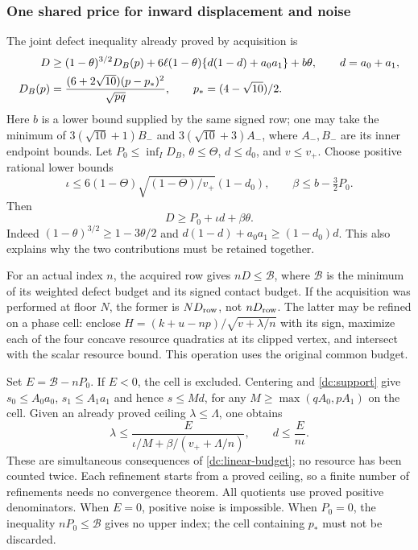\subsubsection{One shared price for inward displacement and noise}
\label{dc:budget}
The joint defect inequality already proved by acquisition is
\begin{align}
 D\ge{}&(1-\theta)^{3/2}D_B(p)
 +6\ell(1-\theta)\{d(1-d)+a_0a_1\}+b\theta,
 \qquad d=a_0+a_1,\label{dc:joint}\\
 D_B(p)={}&\frac{(6+2\sqrt{10})(p-p_*)^2}{\sqrt{pq}},
 \qquad p_*=(4-\sqrt{10})/2.\notag
\end{align}
Here $b$ is a lower bound supplied by the same signed row; one may take
the minimum of $3(\sqrt{10}+1)B_-$ and
$3(\sqrt{10}+3)A_-$, where $A_-,B_-$ are its inner endpoint bounds.
Let $P_0\le\inf_I D_B$, $\theta\le\Theta$, $d\le d_0$, and $v\le v_+$.
Choose positive rational lower bounds
\[
 \iota\le6(1-\Theta)\sqrt{(1-\Theta)/v_+}(1-d_0),\qquad
 \beta\le b-\tfrac32P_0.
\]
Then
\begin{equation}\label{dc:linear-budget}
                 D\ge P_0+\iota d+\beta\theta.
\end{equation}
Indeed $(1-\theta)^{3/2}\ge1-3\theta/2$ and
$d(1-d)+a_0a_1\ge(1-d_0)d$. This also explains why the two
contributions must be retained together.

For an actual index $n$, the acquired row gives
$nD\le\mathcal B$, where $\mathcal B$ is the minimum of its weighted
defect budget and its signed contact budget. If the acquisition was performed
at floor $N$, the former is $ND_{\rm row}$, not $nD_{\rm row}$.
The latter may be refined on a phase cell: enclose
$H=(k+u-np)/\sqrt{v+\lambda/n}$ with its sign, maximize each of the four
concave resource quadratics at its clipped vertex, and intersect with the
scalar resource bound. This operation uses the original common budget.

Set $E=\mathcal B-nP_0$. If $E<0$, the cell is excluded. Centering and
\eqref{dc:support} give $s_0\le A_0a_0$, $s_1\le A_1a_1$ and hence
$s\le Md$, for any $M\ge\max(qA_0,pA_1)$ on the cell.
Given an already proved ceiling $\lambda\le\Lambda$, one obtains
\begin{equation}\label{dc:noise-cap}
 \lambda\le
 \frac{E}{\iota/M+\beta/(v_++\Lambda/n)},\qquad
 d\le\frac{E}{n\iota}.
\end{equation}
These are simultaneous consequences of \eqref{dc:linear-budget}; no
resource has been counted twice. Each refinement starts from a proved
ceiling, so a finite number of refinements needs no convergence theorem.
All quotients use proved positive denominators. When $E=0$, positive noise
is impossible. When $P_0=0$, the inequality $nP_0\le\mathcal B$ gives no
upper index; the cell containing $p_*$ must not be discarded.

